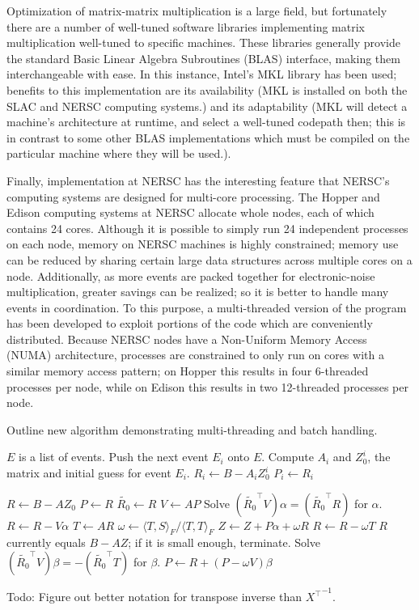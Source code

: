 Optimization of matrix-matrix multiplication is a large field, but fortunately there are a number of well-tuned software libraries implementing matrix multiplication well-tuned to specific machines.  These libraries generally provide the standard Basic Linear Algebra Subroutines (BLAS) interface, making them interchangeable with ease.  In this instance, Intel's MKL library has been used; benefits to this implementation are its availability (MKL is installed on both the SLAC and NERSC computing systems.) and its adaptability (MKL will detect a machine's architecture at runtime, and select a well-tuned codepath then; this is in contrast to some other BLAS implementations which must be compiled on the particular machine where they will be used.).

Finally, implementation at NERSC has the interesting feature that NERSC's computing systems are designed for multi-core processing.  The Hopper and Edison computing systems at NERSC allocate whole nodes, each of which contains 24 cores.  Although it is possible to simply run 24 independent processes on each node, memory on NERSC machines is highly constrained; memory use can be reduced by sharing certain large data structures across multiple cores on a node.  Additionally, as more events are packed together for electronic-noise multiplication, greater savings can be realized; so it is better to handle many events in coordination.  To this purpose, a multi-threaded version of the program has been developed to exploit portions of the code which are conveniently distributed.  Because NERSC nodes have a Non-Uniform Memory Access (NUMA) architecture, processes are constrained to only run on cores with a similar memory access pattern; on Hopper this results in four 6-threaded processes per node, while on Edison this results in two 12-threaded processes per node.


Outline new algorithm demonstrating multi-threading and batch handling.

\begin{algorithmic}
\STATE $E$ is a list of events.
  \STATE Push the next event $E_i$ onto $E$.
  \STATE Compute $A_i$ and $Z_0^i$, the matrix and initial guess for event $E_i$.
  \STATE $R_i \gets B-A_i Z_0^i$
  \STATE $P_i \gets R_i$
\ENDWHILE

\STATE $R \gets B-AZ_0$
\STATE $P \gets R$
\STATE $\widetilde{R_0} \gets R$
  \STATE $V \gets AP$
  \STATE Solve $(\widetilde{R_0}^\top V)\alpha = (\widetilde{R_0}^\top R)$ for $\alpha$.
  \STATE $R \gets R - V\alpha$
  \STATE $T \gets AR$
  \STATE $\omega \gets {\langle T,S\rangle_F} / {\langle T,T\rangle_F} $
  \STATE $Z \gets Z + P\alpha + \omega R$
  \STATE $R \gets R - \omega T$
  \STATE $R$ currently equals $B-AZ$; if it is small enough, terminate.
  \STATE Solve $(\widetilde{R_0}^\top V)\beta = -(\widetilde{R_0}^\top T)$ for $\beta$.
  \STATE $P \gets R + (P - \omega V) \beta$
\ENDWHILE
\end{algorithmic}




Todo: Figure out better notation for transpose inverse than ${X^\top}^{-1}$.


